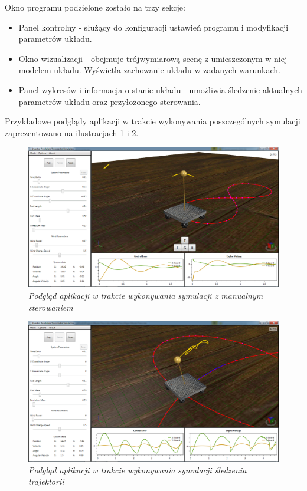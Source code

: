 \documentclass[12pt, oneside]{report}
\theoremstyle{definition}
\begin{document}
Okno programu podzielone zostało na trzy sekcje:
\begin{itemize}
\item Panel kontrolny - służący do konfiguracji ustawień programu i modyfikacji parametrów układu.
\item Okno wizualizacji - obejmuje trójwymiarową scenę z umieszczonym w niej modelem układu. Wyświetla zachowanie układu w zadanych warunkach.
\item Panel wykresów i informacja o stanie układu - umożliwia śledzenie aktualnych parametrów układu oraz przyłożonego sterowania.
\end{itemize}

Przykładowe podglądy aplikacji w trakcie wykonywania poszczególnych symulacji zaprezentowano na ilustracjach \ref{Application} i \ref{Simulation}.

\begin{figure}[H]
	\centering
		\includegraphics[width = 400pt]{Application} 
		\caption{\textit{Podgląd aplikacji w trakcie wykonywania symulacji z manualnym sterowaniem}}
		\label{Application}
\end{figure}

\begin{figure}[H]
	\centering
		\includegraphics[width = 400pt]{Simulation} 
		\caption{\textit{Podgląd aplikacji w trakcie wykonywania symulacji śledzenia trajektorii}}
		\label{Simulation}
\end{figure}
\end{document}
